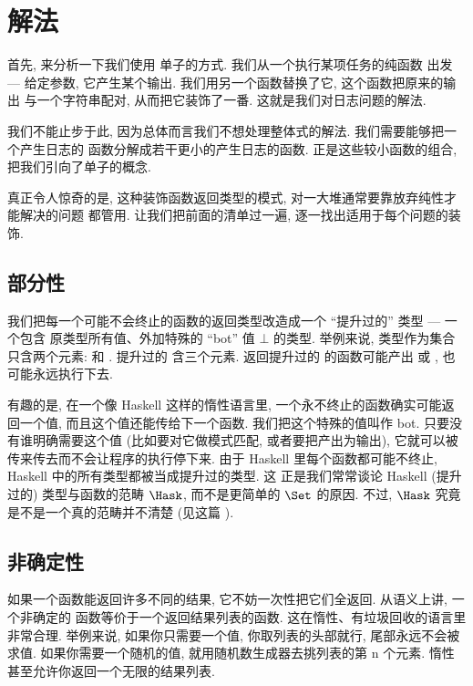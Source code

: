 \section{解法}

首先, 来分析一下我们使用  单子的方式. 我们从一个执行某项任务的纯函数
出发 --- 给定参数, 它产生某个输出. 我们用另一个函数替换了它, 这个函数把原来的输出
与一个字符串配对, 从而把它装饰了一番. 这就是我们对日志问题的解法.

我们不能止步于此, 因为总体而言我们不想处理整体式的解法. 我们需要能够把一个产生日志的
函数分解成若干更小的产生日志的函数. 正是这些较小函数的组合, 把我们引向了单子的概念.

真正令人惊奇的是, 这种装饰函数返回类型的模式, 对一大堆通常要靠放弃纯性才能解决的问题
都管用. 让我们把前面的清单过一遍, 逐一找出适用于每个问题的装饰.

\subsection{部分性}

我们把每一个可能不会终止的函数的返回类型改造成一个 ``提升过的'' 类型 --- 一个包含
原类型所有值、外加特殊的 ``bot'' 值 $\bot$ 的类型. 举例来说,  类型作为集合
只含两个元素:  和 . 提升过的  含三个元素. 返回提升过的
 的函数可能产出  或 , 也可能永远执行下去.

有趣的是, 在一个像 Haskell 这样的惰性语言里, 一个永不终止的函数确实可能返回一个值,
而且这个值还能传给下一个函数. 我们把这个特殊的值叫作 bot. 只要没有谁明确需要这个值
(比如要对它做模式匹配, 或者要把产出为输出), 它就可以被传来传去而不会让程序的执行停下来.
由于 Haskell 里每个函数都可能不终止, Haskell 中的所有类型都被当成提升过的类型. 这
正是我们常常谈论 Haskell (提升过的) 类型与函数的范畴 $\Hask$, 而不是更简单的 $\Set$
的原因. 不过, $\Hask$ 究竟是不是一个真的范畴并不清楚 (见这篇
).

\subsection{非确定性}

如果一个函数能返回许多不同的结果, 它不妨一次性把它们全返回. 从语义上讲, 一个非确定的
函数等价于一个返回结果列表的函数. 这在惰性、有垃圾回收的语言里非常合理. 举例来说,
如果你只需要一个值, 你取列表的头部就行, 尾部永远不会被求值. 如果你需要一个随机的值,
就用随机数生成器去挑列表的第 n 个元素. 惰性甚至允许你返回一个无限的结果列表.

